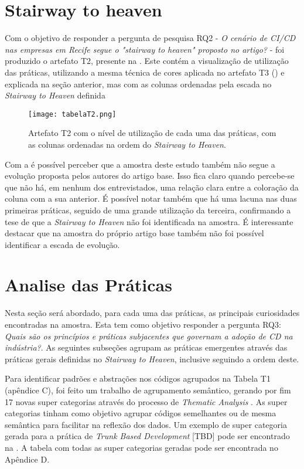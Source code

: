 \section{Stairway to heaven}

Com o objetivo de responder a pergunta de pesquisa RQ2 - \emph{ O cenário de CI/CD nas empresas em Recife segue o "stairway to heaven" proposto no artigo?} - foi produzido o artefato T2, presente na . Este contém a visualização de utilização das práticas, utilizando a mesma técnica de cores aplicada no artefato T3 () e explicada na seção anterior, mas com as colunas ordenadas pela escada  no \emph{Stairway to Heaven} definida

\begin{figure}[ht]
\begin{center}
\texttt{[image: tabelaT2.png]}
\end{center}
\caption[Artefato T2]{
    Artefato T2 com o nível de utilização de cada uma das práticas, com as colunas ordenadas na ordem do \emph{Stairway to Heaven}.
}\label{tabela_t2}
\end{figure}

Com a  é possível perceber que a amostra deste estudo também não segue a evolução proposta pelos autores do artigo base. Isso fica claro quando percebe-se que não há, em nenhum dos entrevistados, uma relação clara entre a coloração da coluna com a sua anterior. É possível notar também que há uma lacuna nas duas primeiras práticas, seguido de uma grande utilização da terceira, confirmando a tese de que a \emph{Stairway to Heaven} não foi identificada na amostra. É interessante destacar que na amostra do próprio artigo base também não foi possível identificar a escada de evolução.

\section{Analise das Práticas}

Nesta seção será abordado, para cada uma das práticas, as principais curiosidades encontradas na amostra. Esta tem como objetivo responder a pergunta RQ3: \emph{Quais são os princípios e práticas subjacentes que governam a adoção de CD na indústria?}. As seguintes subseções agrupam as práticas emergentes através das práticas gerais definidas no \emph{Stairway to Heaven}, inclusive seguindo a ordem deste.

Para identificar padrões e abstrações nos códigos agrupados na Tabela T1 (apêndice C), foi feito um trabalho de agrupamento semântico, gerando por fim 17 novas super categorias através do processo de \emph{Thematic Analysis} \cite{groundedTheory}. As super categorias tinham como objetivo agrupar códigos semelhantes ou de mesma semântica para facilitar na reflexão dos dados. Um exemplo de super categoria gerada para a prática de \emph{Trunk Based Development} [TBD] pode ser encontrado na . A tabela com todas as super categorias geradas pode ser encontrada no Apêndice D.

